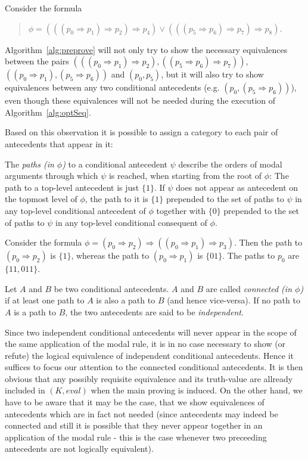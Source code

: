\documentclass{entcs} \usepackage{entcsmacro}
\begin{document}
\begin{example}
Consider the formula 
\begin{quote}
$\phi=(((p_0\Rightarrow p_1)\Rightarrow p_2)\Rightarrow p_4)\vee
(((p_5\Rightarrow p_6)\Rightarrow p_7)\Rightarrow p_8)$.
\end{quote}
Algorithm~\ref{alg:preprove} will not only
try to show the necessary equivalences between the pairs
$(((p_0\Rightarrow p_1)\Rightarrow p_2), ((p_5\Rightarrow p_6)\Rightarrow p_7))$,
$((p_0\Rightarrow p_1), (p_5\Rightarrow p_6))$ and $(p_0,p_5)$, but it will
also try to show equivalences between any two conditional antecedents (e.g. $(p_0,
(p_5\Rightarrow p_6))$), even though these equivalences will not be needed
during the execution of Algorithm~\ref{alg:optSeq}.
\end{example}

Based on this observation it is possible to assign a category to each pair of
antecedents that appear in it:

\begin{definition}
The \emph{paths (in $\phi$)} to a conditional antecedent $\psi$ describe the orders
of modal arguments through which $\psi$ is reached, when starting from the root
of $\phi$:
The path to a top-level antecedent is just $\{1\}$. If $\psi$ does not appear as
antecedent on the topmost level of $\phi$, the path to it is $\{1\}$ prepended to the set
of paths to $\psi$ in any top-level conditional antecedent of $\phi$ together with $\{0\}$
prepended to the set of paths to $\psi$ in any top-level conditional consequent of $\phi$.
\end{definition}

\begin{example}
Consider the formula $\phi=(p_0\Rightarrow p_2)\Rightarrow ((p_0\Rightarrow p_1)\Rightarrow p_3)$. Then the path to
$(p_0\Rightarrow p_2)$ is $\{1\}$, whereas the path to $(p_0\Rightarrow p_1)$ is $\{01\}$. The paths
to $p_0$ are $\{11,011\}$.
\end{example}

\begin{definition}
Let $A$ and $B$ be two conditional antecedents. $A$ and $B$ are called \emph{connected (in $\phi$)} if
at least one path to $A$ is also a path to $B$ (and hence vice-versa). If no path to $A$ is a path to $B$,
the two antecedents are said to be \emph{independent}.
\end{definition}

Since two independent conditional antecedents will never appear in the scope of the
same application of the modal rule, it is in no case necessary to show (or
refute) the logical equivalence of independent conditional antecedents. Hence it suffices to focus
our attention to the connected conditional antecedents. It is then obvious that
any possibly requisite equivalence and its truth-value are allready included in $(K,eval)$
when the main proving is induced. On the other hand, we have to be aware that it
may be the case, that we show equivalences of antecedents which are in fact not needed
(since antecedents may indeed be connected and still it is possible that they never appear together in an application
of the modal rule - this is the case whenever two preceeding antecedents are not logically equivalent).
\end{document}
